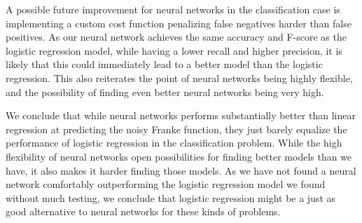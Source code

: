 A possible future improvement for neural networks in the classification case is implementing a custom cost function penalizing false negatives harder than false positives.
As our neural network achieves the same accuracy and F-score as the logistic regression model, while having a lower recall and higher precision, it is likely that this could immediately lead to a better model than the logistic regression.
This also reiterates the point of neural networks being highly flexible, and the possibility of finding even better neural networks being very high.

We conclude that while neural networks performs substantially better than linear regression at predicting the noisy Franke function, they just barely equalize the performance of logistic regression in the classification problem.
While the high flexibility of neural networks open possibilities for finding better models than we have, it also makes it harder finding those models.
As we have not found a neural network comfortably outperforming the logistic regression model we found without much testing, we conclude that logistic regression might be a just as good alternative to neural networks for these kinds of problems.

